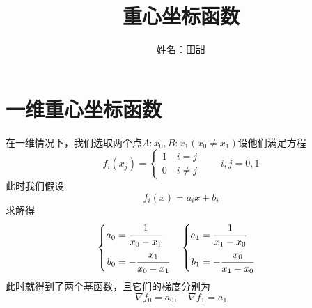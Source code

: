 \documentclass[12pt,a4paper]{article}
\title{重心坐标函数}
\author{姓名：田甜}
\date{\chntoday}
\begin{document}
\maketitle
\newpage
\section{一维重心坐标函数}
在一维情况下，我们选取两个点$A:x_0,B:x_1(x_0 \neq x_1)$设他们满足方程\begin{equation}
f_i(x_j)=\begin{cases}1 \quad i=j
\\ 0\quad i\neq j\end{cases}\qquad i,j=0,1
\label{eqaution1}
\end{equation}
此时我们假设\begin{equation}
f_i(x)=a_ix+b_i
\label{eqaution2}
\end{equation}
求解得$$\begin{cases}
\begin{aligned}a_0&=\cfrac{1}{x_0-x_1}\\  b_0&=-\cfrac{x_1}{x_0-x_1}\end{aligned}
\end{cases}
\begin{cases}\begin{aligned}a_1&=\cfrac{1}{x_1-x_0}\\  b_1&=-\cfrac{x_0}{x_1-x_0}\end{aligned}\end{cases}$$
此时就得到了两个基函数，且它们的梯度分别为$$\nabla f_0=a_0,\quad \nabla f_1=a_1$$
\end{document}
